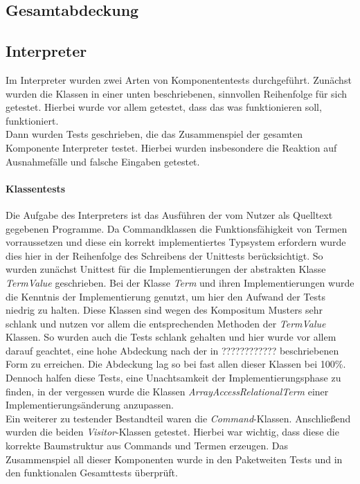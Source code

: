 \documentclass[parskip=full]{scrartcl}
\begin{document}
\subsection{Gesamtabdeckung}
\subsection{Interpreter}
Im Interpreter wurden zwei Arten von Komponententests durchgeführt. Zunächst wurden die Klassen in einer unten beschriebenen, sinnvollen Reihenfolge für sich getestet. 
Hierbei wurde vor allem getestet, dass das was funktionieren soll, funktioniert.\\ %
Dann wurden Tests geschrieben, die das Zusammenspiel der gesamten Komponente Interpreter testet. Hierbei wurden insbesondere die Reaktion auf Ausnahmefälle und falsche Eingaben getestet.
\paragraph{Klassentests}
Die Aufgabe des Interpreters ist das Ausführen der vom Nutzer als Quelltext gegebenen Programme. 
Da Commandklassen die Funktionsfähigkeit von Termen vorraussetzen und diese ein korrekt implementiertes Typsystem erfordern wurde dies hier in der Reihenfolge des Schreibens der Unittests berücksichtigt. 
So wurden zunächst Unittest für die Implementierungen der abstrakten Klasse \textit{TermValue} geschrieben.
Bei der Klasse \textit{Term} und ihren Implementierungen wurde die Kenntnis der Implementierung genutzt, um hier den Aufwand der Tests niedrig zu halten. Diese Klassen sind wegen des Kompositum Musters sehr schlank und nutzen vor allem die entsprechenden Methoden der \textit{TermValue} Klassen. So wurden auch die Tests schlank gehalten und hier wurde vor allem darauf geachtet, eine hohe Abdeckung nach der in %
 ???????????? beschriebenen Form zu erreichen. Die Abdeckung lag so bei fast allen dieser Klassen bei 100\%. Dennoch halfen diese Tests, eine Unachtsamkeit der Implementierungsphase zu finden, in der vergessen wurde die Klassen \textit{ArrayAccessRelationalTerm} einer Implementierungsänderung anzupassen.\\
Ein weiterer zu testender Bestandteil waren die \textit{Command}-Klassen. 
Anschließend wurden die beiden \textit{Visitor}-Klassen getestet. Hierbei war wichtig, dass diese die korrekte Baumstruktur aus Commands und Termen erzeugen.
Das Zusammenspiel all dieser Komponenten wurde in den Paketweiten Tests und in den funktionalen Gesamttests überprüft.
\end{document}
